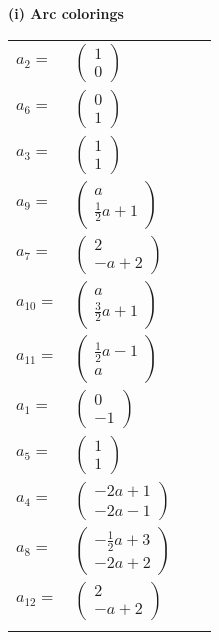 \documentclass[1p]{elsarticle_modified}
\theoremstyle{definition}
\begin{document}
\flushleft \textbf{(i) Arc colorings}\\
\begin{tabular}{m{7pt} m{180pt} m{7pt} m{180pt} }
\flushright $a_{2}=$&$\begin{pmatrix}1\\0\end{pmatrix}$ \\
\flushright $a_{6}=$&$\begin{pmatrix}0\\1\end{pmatrix}$ \\
\flushright $a_{3}=$&$\begin{pmatrix}1\\1\end{pmatrix}$ \\
\flushright $a_{9}=$&$\begin{pmatrix}a\\\frac{1}{2} a+1\end{pmatrix}$ \\
\flushright $a_{7}=$&$\begin{pmatrix}2\\- a+2\end{pmatrix}$ \\
\flushright $a_{10}=$&$\begin{pmatrix}a\\\frac{3}{2} a+1\end{pmatrix}$ \\
\flushright $a_{11}=$&$\begin{pmatrix}\frac{1}{2} a-1\\a\end{pmatrix}$ \\
\flushright $a_{1}=$&$\begin{pmatrix}0\\-1\end{pmatrix}$ \\
\flushright $a_{5}=$&$\begin{pmatrix}1\\1\end{pmatrix}$ \\
\flushright $a_{4}=$&$\begin{pmatrix}-2 a+1\\-2 a-1\end{pmatrix}$ \\
\flushright $a_{8}=$&$\begin{pmatrix}-\frac{1}{2} a+3\\-2 a+2\end{pmatrix}$ \\
\flushright $a_{12}=$&$\begin{pmatrix}2\\- a+2\end{pmatrix}$\\&\end{tabular}
\end{document}
